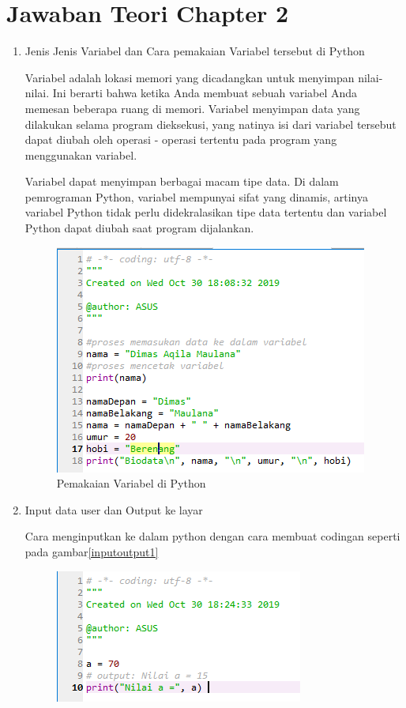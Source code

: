 \section{Jawaban Teori Chapter 2}
\begin{enumerate}
    \item Jenis Jenis Variabel dan Cara pemakaian Variabel tersebut di Python
    \par Variabel adalah lokasi memori yang dicadangkan untuk menyimpan nilai-nilai. Ini berarti bahwa ketika Anda membuat sebuah variabel Anda memesan beberapa ruang di memori. Variabel menyimpan data yang dilakukan selama program dieksekusi, yang natinya isi dari variabel tersebut dapat diubah oleh operasi - operasi tertentu pada program yang menggunakan variabel.
    \par
    Variabel dapat menyimpan berbagai macam tipe data. Di dalam pemrograman Python, variabel mempunyai sifat yang dinamis, artinya variabel Python tidak perlu didekralasikan tipe data tertentu dan variabel Python dapat diubah saat program dijalankan.
    \par
    \begin{figure}[!htbp]
    \centering 
    \includegraphics[scale=0.9]{figures/pemakaianvariabel.PNG} 
    \caption{Pemakaian Variabel di Python}
    \label{variabel}
    \end{figure}
    \item Input data user dan Output ke layar
    \par
    Cara menginputkan ke dalam python dengan cara membuat codingan seperti
    pada gambar\ref{inputoutput1}
    \begin{figure}[!htbp]
    \centering 
    \includegraphics[scale=1.2]{figures/inputoutput1.PNG} 

\end{figure}
\end{enumerate}
